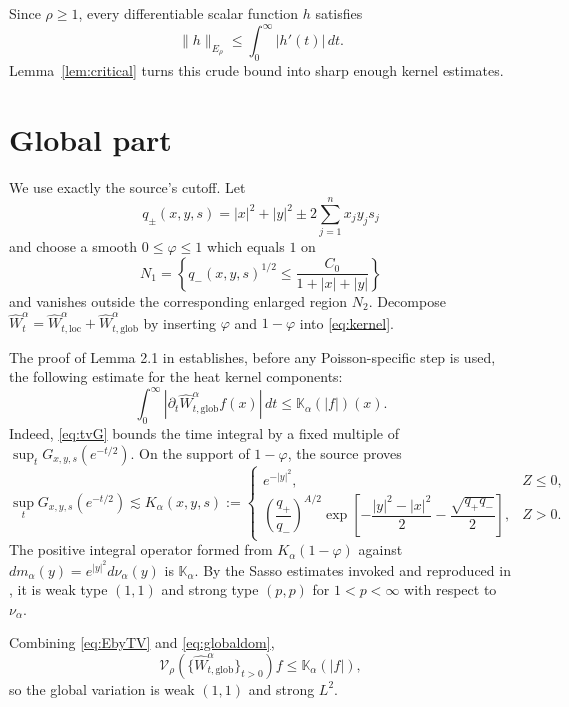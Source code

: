 \documentclass[11pt]{article}
\newcommand{\V}{\mathcal V}
\newcommand{\W}{\widehat W}
\newcommand{\nuA}{\nu_\alpha}
\newcommand{\dmA}{m_\alpha}
\begin{document}
Since $\rho\geq1$, every differentiable scalar function $h$ satisfies
\begin{equation}\label{eq:EbyTV}
 \|h\|_{E_\rho}\leq\int_0^\infty|h'(t)|\,dt.
\end{equation}
Lemma~\ref{lem:critical} turns this crude bound into sharp enough kernel
estimates.

\section{Global part}

We use exactly the source's cutoff.  Let
\[
 q_\pm(x,y,s)=|x|^2+|y|^2\pm2\sum_{j=1}^nx_jy_js_j
\]
and choose a smooth $0\leq\varphi\leq1$ which equals $1$ on
\[
 N_1=\left\{q_-(x,y,s)^{1/2}\leq
 \frac{C_0}{1+|x|+|y|}\right\}
\]
and vanishes outside the corresponding enlarged region $N_2$.  Decompose
$\W_t^\alpha=\W_{t,\mathrm{loc}}^\alpha+
\W_{t,\mathrm{glob}}^\alpha$ by inserting $\varphi$ and $1-\varphi$ into
\eqref{eq:kernel}.

The proof of Lemma 2.1 in \cite{source} establishes, before any Poisson-specific
step is used, the following estimate for the heat kernel components:
\begin{equation}\label{eq:globaldom}
 \int_0^\infty|\partial_t\W_{t,\mathrm{glob}}^\alpha f(x)|\,dt
 \leq \mathbb K_\alpha(|f|)(x).
\end{equation}
Indeed, \eqref{eq:tvG} bounds the time integral by a fixed multiple of
$\sup_tG_{x,y,s}(e^{-t/2})$.  On the support of $1-\varphi$, the source proves
\begin{equation}\label{eq:K}
 \sup_tG_{x,y,s}(e^{-t/2})\lesssim K_\alpha(x,y,s):=
 \begin{cases}
 e^{-|y|^2},&Z\leq0,\\[2mm]
 \left(\dfrac{q_+}{q_-}\right)^{A/2}
 \exp\!\left[-\dfrac{|y|^2-|x|^2}{2}
 -\dfrac{\sqrt{q_+q_-}}2\right],&Z>0.
 \end{cases}
\end{equation}
The positive integral operator formed from $K_\alpha(1-\varphi)$ against
$d\dmA(y)=e^{|y|^2}d\nuA(y)$ is $\mathbb K_\alpha$.  By the Sasso estimates
invoked and reproduced in \cite[Lemma 2.1]{source}, it is weak type $(1,1)$
and strong type $(p,p)$ for $1<p<\infty$ with respect to $\nuA$.

Combining \eqref{eq:EbyTV} and \eqref{eq:globaldom},
\begin{equation}\label{eq:globalweak}
 \V_\rho(\{\W_{t,\mathrm{glob}}^\alpha\}_{t>0})f
 \leq\mathbb K_\alpha(|f|),
\end{equation}
so the global variation is weak $(1,1)$ and strong $L^2$.
\end{document}

